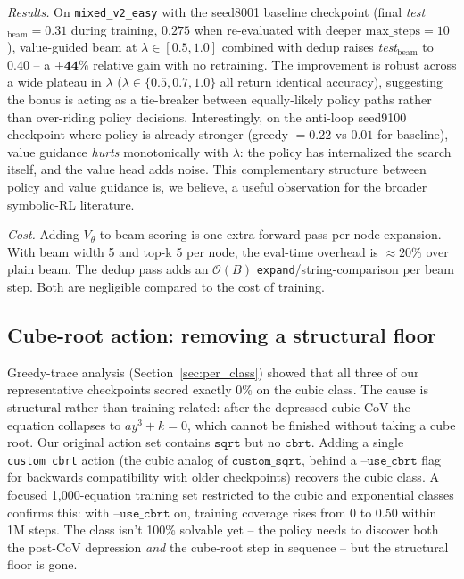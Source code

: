 \documentclass{article}
\theoremstyle{plain}
\theoremstyle{definition}
\theoremstyle{remark}
\begin{document}
\textit{Results.} On \texttt{mixed\_v2\_easy} with the seed8001 baseline checkpoint (final \textit{test}$_{\text{beam}}=0.31$ during training, $0.275$ when re-evaluated with deeper $\text{max\_steps}=10$), value-guided beam at $\lambda \in [0.5, 1.0]$ combined with dedup raises \textit{test}$_{\text{beam}}$ to $\mathbf{0.40}$ -- a $\mathbf{+44\%}$ relative gain with no retraining. The improvement is robust across a wide plateau in $\lambda$ ($\lambda \in \{0.5, 0.7, 1.0\}$ all return identical accuracy), suggesting the bonus is acting as a tie-breaker between equally-likely policy paths rather than over-riding policy decisions. Interestingly, on the anti-loop seed9100 checkpoint where policy is already stronger (greedy $=0.22$ vs $0.01$ for baseline), value guidance \emph{hurts} monotonically with $\lambda$: the policy has internalized the search itself, and the value head adds noise. This complementary structure between policy and value guidance is, we believe, a useful observation for the broader symbolic-RL literature.

\textit{Cost.} Adding $V_\theta$ to beam scoring is one extra forward pass per node expansion. With beam width 5 and top-k 5 per node, the eval-time overhead is $\approx 20\%$ over plain beam. The dedup pass adds an $\mathcal{O}(B)$ \texttt{expand}/string-comparison per beam step. Both are negligible compared to the cost of training.

\subsection{Cube-root action: removing a structural floor}
\label{sec:cbrt}
Greedy-trace analysis (Section~\ref{sec:per_class}) showed that all three of our representative checkpoints scored exactly $0\%$ on the cubic class. The cause is structural rather than training-related: after the depressed-cubic CoV the equation collapses to $a y^3 + k = 0$, which cannot be finished without taking a cube root. Our original action set contains $\texttt{sqrt}$ but no $\texttt{cbrt}$. Adding a single \texttt{custom\_cbrt} action (the cubic analog of $\texttt{custom\_sqrt}$, behind a $\texttt{--use\_cbrt}$ flag for backwards compatibility with older checkpoints) recovers the cubic class. A focused 1{,}000-equation training set restricted to the cubic and exponential classes confirms this: with $\texttt{--use\_cbrt}$ on, training coverage rises from $0$ to $0.50$ within 1M steps. The class isn't 100\% solvable yet -- the policy needs to discover both the post-CoV depression \emph{and} the cube-root step in sequence -- but the structural floor is gone.
\end{document}
